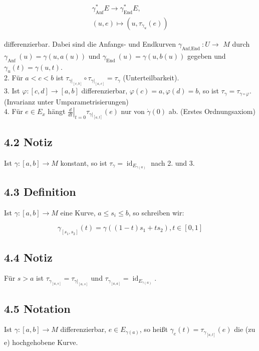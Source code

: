 \documentclass[10pt, letterpaper]{article}
\begin{document}
$$
\begin{gathered}
\gamma_{\mathrm{Anf}}^{*} E \rightarrow \gamma_{\mathrm{End}}^{*} E, \\
(u, e) \mapsto\left(u, \tau_{\gamma_{u}}(e)\right)
\end{gathered}
$$

differenzierbar. Dabei sind die Anfangs- und Endkurven $\gamma_{\text {Anf,End }}: U \rightarrow$ $M$ durch $\gamma_{\text {Anf }}(u)=\gamma(u, a(u))$ und $\gamma_{\text {End }}(u)=\gamma(u, b(u))$ gegeben und $\gamma_{u}(t)=\gamma(u, t)$.\\
2. Für $a<c<b$ ist $\tau_{\left.\gamma\right|_{[c, b]}} \circ \tau_{\left.\gamma\right|_{[a, c]}}=\tau_{\gamma}$ (Unterteilbarkeit).\\
3. Ist $\varphi:[c, d] \rightarrow[a, b]$ differenzierbar, $\varphi(c)=a, \varphi(d)=b$, so ist $\tau_{\gamma}=\tau_{\gamma \circ \varphi}$. (Invarianz unter Umparametrisierungen)\\
4. Für $e \in E_{x}$ hängt $\left.\frac{d}{d t}\right|_{t=0} \tau_{\left.\gamma\right|_{[a, t]}}(e)$ nur von $\dot{\gamma}(0)$ ab. (Erstes Ordnungsaxiom)

\subsection*{4.2 Notiz}
Ist $\gamma:[a, b] \rightarrow M$ konstant, so ist $\tau_{\gamma}=\operatorname{id}_{E_{\gamma(a)}}$ nach 2. und 3.

\subsection*{4.3 Definition}
Ist $\gamma:[a, b] \rightarrow M$ eine Kurve, $a \leq s_{i} \leq b$, so schreiben wir:

$$
\gamma_{\left[s_{1}, s_{2}\right]}(t)=\gamma\left((1-t) s_{1}+t s_{2}\right), t \in[0,1]
$$

\subsection*{4.4 Notiz}
Für $s>a$ ist $\tau_{\gamma_{[a, s]}}=\tau_{\left.\gamma\right|_{[a, s]}}$ und $\tau_{\gamma_{[a, a]}}=\operatorname{id}_{E_{\gamma(a)}}$.

\subsection*{4.5 Notation}
Ist $\gamma:[a, b] \rightarrow M$ differenzierbar, $e \in E_{\gamma(a)}$, so heißt $\gamma_{e}(t)=\tau_{\gamma_{[a, t]}}(e)$ die (zu e) hochgehobene Kurve.
\end{document}
